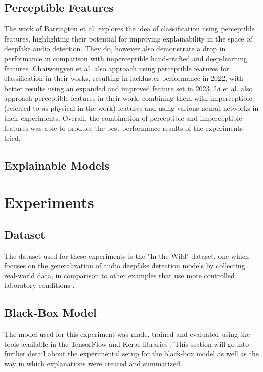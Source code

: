 \documentclass{article}
\begin{document}
	\subsection{Perceptible Features}
	The work of Barrington et al. \cite{barrington_single_2023} explores the idea of classification
	using perceptible features, highlighting their potential for improving explainability in the
	space of deepfake audio detection. They do, however also demonstrate a drop in performance in
	comparison with imperceptible hand-crafted and deep-learning features.
	\newline
	Chaiwongyen et al. \cite{chaiwongyen_contribution_2022,chaiwongyen_deepfake-speech_2023} also
	approach using perceptible features for classification in their works, resulting in lackluster
	performance in 2022, with better results using an expanded and improved feature set in 2023.
	\newline
	Li et al. \cite{li_comparative_2022} also approach perceptible features in their work,
	combining them with imperceptible (referred to as physical in the work) features and using
	various neural networks in their experiments. Overall, the combination of perceptible and
	imperceptible features was able to produce the best performance results of the experiments
	tried.
	\subsection{Explainable Models}
	\section{Experiments}
		\subsection{Dataset}
		The dataset used for these experiments is the "In-the-Wild" dataset, one which focuses on
		the generalization of audio deepfake detection models by collecting real-world data, in
		comparison to other examples that use more controlled laboratory conditions
		\cite{muller_does_2022}.
		\subsection{Black-Box Model}
		The model used for this experiment was made, trained and evaluated using the tools
		available in the TensorFlow and Keras libraries \cite{tensorflow2015-whitepaper}. This
		section will go into further detail about the experimental setup for the black-box model
		as well as the way in which explanations were created and summarized.
\end{document}
